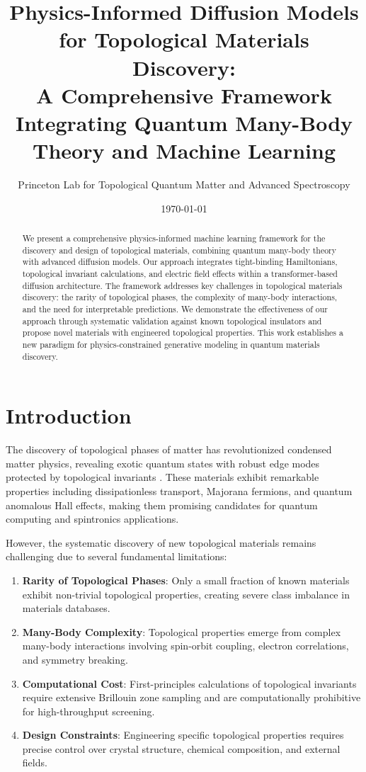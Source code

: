 \documentclass[12pt,a4paper]{article}
\title{Physics-Informed Diffusion Models for Topological Materials Discovery: \\
A Comprehensive Framework Integrating Quantum Many-Body Theory and Machine Learning}
\author{Princeton Lab for Topological Quantum Matter and Advanced Spectroscopy}
\date{\today}
\begin{document}
\maketitle

\begin{abstract}
We present a comprehensive physics-informed machine learning framework for the discovery and design of topological materials, combining quantum many-body theory with advanced diffusion models. Our approach integrates tight-binding Hamiltonians, topological invariant calculations, and electric field effects within a transformer-based diffusion architecture. The framework addresses key challenges in topological materials discovery: the rarity of topological phases, the complexity of many-body interactions, and the need for interpretable predictions. We demonstrate the effectiveness of our approach through systematic validation against known topological insulators and propose novel materials with engineered topological properties. This work establishes a new paradigm for physics-constrained generative modeling in quantum materials discovery.
\end{abstract}

\section{Introduction}

The discovery of topological phases of matter has revolutionized condensed matter physics, revealing exotic quantum states with robust edge modes protected by topological invariants \cite{hasan2010colloquium, qi2011topological}. These materials exhibit remarkable properties including dissipationless transport, Majorana fermions, and quantum anomalous Hall effects, making them promising candidates for quantum computing and spintronics applications.

However, the systematic discovery of new topological materials remains challenging due to several fundamental limitations:

\begin{enumerate}
\item \textbf{Rarity of Topological Phases}: Only a small fraction of known materials exhibit non-trivial topological properties, creating severe class imbalance in materials databases.

\item \textbf{Many-Body Complexity}: Topological properties emerge from complex many-body interactions involving spin-orbit coupling, electron correlations, and symmetry breaking.

\item \textbf{Computational Cost}: First-principles calculations of topological invariants require extensive Brillouin zone sampling and are computationally prohibitive for high-throughput screening.

\item \textbf{Design Constraints}: Engineering specific topological properties requires precise control over crystal structure, chemical composition, and external fields.
\end{enumerate}
\end{document}
